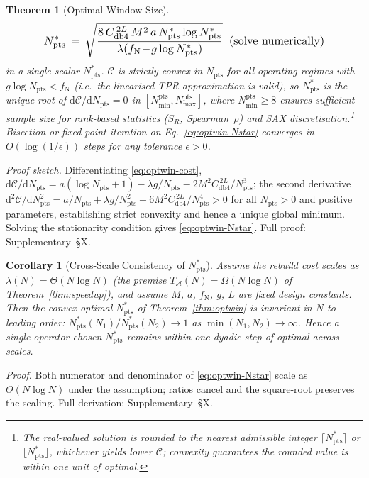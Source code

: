 \documentclass[10pt,journal,compsoc]{IEEEtran}
\newtheorem{theorem}{Theorem}
\newtheorem{corollary}{Corollary}
\newcommand{\SR}{S_{R}}
\newcommand{\Nstar}{N^{*}_{\mathrm{pts}}}
\newcommand{\Npts}{N_{\mathrm{pts}}}
\begin{document}
\begin{theorem}[Optimal Window Size]
\begin{equation}\label{eq:optwin-Nstar}
\resizebox{0.82\columnwidth}{!}{$\displaystyle
\Nstar\,=\,\sqrt{\frac{8\,C_{\mathrm{db4}}^{\,2L}\,M^{2}\,a\,\Nstar\log\Nstar}{\lambda(f_{\mathrm{N}}\!-\!g\log\Nstar)}}\;\;\text{(solve numerically)}$}
\end{equation}
in a single scalar $\Nstar$. $\mathcal{C}$ is strictly convex in $\Npts$
for all operating regimes with $g\log \Npts\!<\!f_{\mathrm{N}}$
(i.e.\ the linearised TPR approximation is valid), so $\Nstar$ is the
unique root of $\mathrm{d}\mathcal{C}/\mathrm{d}\Npts\!=\!0$ in
$[N_{\min}^{\mathrm{pts}},N_{\max}^{\mathrm{pts}}]$, where
$N_{\min}^{\mathrm{pts}}\!\geq\!8$ ensures sufficient sample size for
rank-based statistics ($\SR$, Spearman~$\rho$) and SAX
discretisation.\footnote{The real-valued solution is rounded to the
nearest admissible integer
$\lceil\Nstar\rceil$ or $\lfloor\Nstar\rfloor$, whichever yields
lower $\mathcal{C}$; convexity guarantees the rounded value is within
one unit of optimal.} Bisection or fixed-point iteration on
Eq.~\eqref{eq:optwin-Nstar} converges in $O(\log(1/\epsilon))$ steps
for any tolerance $\epsilon\!>\!0$.
\end{theorem}

\noindent\textit{Proof sketch.} Differentiating \eqref{eq:optwin-cost},
$\mathrm{d}\mathcal{C}/\mathrm{d}\Npts\!=\!a(\log \Npts\!+\!1)\!-\!\lambda g/\Npts\!-\!2M^{2}C_{\mathrm{db4}}^{\,2L}\!/\Npts^{3}$;
the second derivative
$\mathrm{d}^{2}\mathcal{C}/\mathrm{d}\Npts^{2}\!=\!a/\Npts\!+\!\lambda g/\Npts^{2}\!+\!6M^{2}C_{\mathrm{db4}}^{\,2L}\!/\Npts^{4}\!>\!0$
for all $\Npts\!>\!0$ and positive parameters, establishing strict
convexity and hence a unique global minimum. Solving the stationarity
condition gives \eqref{eq:optwin-Nstar}. Full proof: Supplementary~\S X.

\begin{corollary}[Cross-Scale Consistency of $\Nstar$]\label{cor:scale-invariance}
Assume the rebuild cost scales as
$\lambda(N)\!=\!\Theta(N\log N)$ (the premise
$T_{\mathcal{A}}(N)\!=\!\Omega(N\log N)$ of Theorem~\ref{thm:speedup}),
and assume $M$, $a$,
$f_{\mathrm{N}}$, $g$, $L$ are fixed design constants. Then the
convex-optimal $\Nstar$ of Theorem~\ref{thm:optwin} is invariant in $N$
to leading order: $\Nstar(N_1)/\Nstar(N_2)\!\to\!1$ as
$\min(N_1,N_2)\!\to\!\infty$. Hence a single operator-chosen $\Nstar$
remains within one dyadic step of optimal across scales.
\end{corollary}
\noindent\textit{Proof.} Both numerator and denominator of
\eqref{eq:optwin-Nstar} scale as $\Theta(N\log N)$ under the
assumption; ratios cancel and the square-root preserves the scaling.
Full derivation: Supplementary~\S X.
\end{document}
